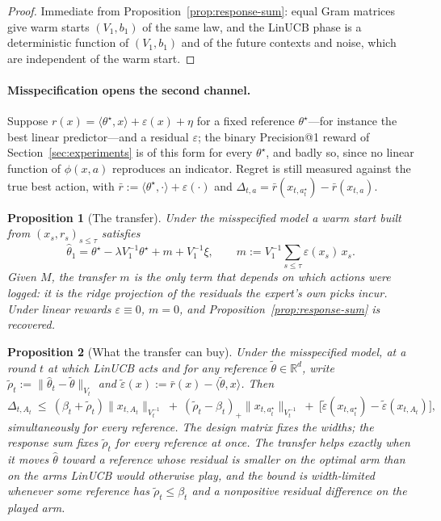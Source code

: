 \documentclass{article}
\newtheorem{proposition}{Proposition}
\theoremstyle{definition}
\theoremstyle{remark}
\newcommand{\R}{\mathbb{R}}
\theoremstyle{remark}
\begin{document}
\begin{proof}
Immediate from Proposition~\ref{prop:response-sum}: equal Gram matrices give
warm starts $(V_1,b_1)$ of the same law, and the LinUCB phase is a
deterministic function of $(V_1,b_1)$ and of the future contexts and noise,
which are independent of the warm start.
\end{proof}

\paragraph{Misspecification opens the second channel.}
Suppose $r(x)=\langle\theta^\star,x\rangle+\varepsilon(x)+\eta$ for a fixed
reference $\theta^\star$---for instance the best linear predictor---and a
residual $\varepsilon$; the binary Precision@1 reward of
Section~\ref{sec:experiments} is of this form for every $\theta^\star$, and
badly so, since no linear function of $\phi(x,a)$ reproduces an indicator.
Regret is still measured against the true best action, with
$\bar r:=\langle\theta^\star,\cdot\rangle+\varepsilon(\cdot)$ and
$\Delta_{t,a}=\bar r(x_{t,a^\star_t})-\bar r(x_{t,a})$.

\begin{proposition}[The transfer]
\label{prop:transfer}
Under the misspecified model a warm start built from $(x_s,r_s)_{s\le\tau}$
satisfies
\[
\widehat\theta_1=\theta^\star-\lambda V_1^{-1}\theta^\star+m+V_1^{-1}\xi,
\qquad
m:=V_1^{-1}\sum_{s\le\tau}\varepsilon(x_s)\,x_s .
\]
Given $M$, the \emph{transfer} $m$ is the only term that depends on which
actions were logged: it is the ridge projection of the residuals the expert's
own picks incur. Under linear rewards $\varepsilon\equiv0$, $m=0$, and
Proposition~\ref{prop:response-sum} is recovered.
\end{proposition}

\begin{proposition}[What the transfer can buy]
\label{prop:transfer-regret}
Under the misspecified model, at a round $t$ at which LinUCB acts and for any
reference $\widetilde\theta\in\R^d$, write
$\widetilde\rho_t:=\|\widehat\theta_t-\widetilde\theta\|_{V_t}$ and
$\widetilde\varepsilon(x):=\bar r(x)-\langle\widetilde\theta,x\rangle$. Then
\[
\Delta_{t,A_t}\ \le\ (\beta_t+\widetilde\rho_t)\|x_{t,A_t}\|_{V_t^{-1}}
\ +\ (\widetilde\rho_t-\beta_t)_+\|x_{t,a^\star_t}\|_{V_t^{-1}}
\ +\ \bigl[\widetilde\varepsilon(x_{t,a^\star_t})-\widetilde\varepsilon(x_{t,A_t})\bigr],
\]
simultaneously for every reference. The design matrix fixes the widths; the
response sum fixes $\widetilde\rho_t$ for every reference at once. The
transfer helps exactly when it moves $\widehat\theta$ toward a reference whose
residual is smaller on the optimal arm than on the arms LinUCB would otherwise
play, and the bound is width-limited whenever some reference has
$\widetilde\rho_t\le\beta_t$ and a nonpositive residual difference on the
played arm.
\end{proposition}
\end{document}
